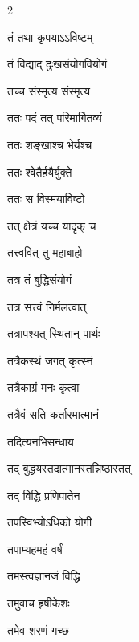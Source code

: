 \begin{multicols}{2}
\begin{indexlist}
\item तं तथा कृपयाऽऽविष्टम् \dotfill {}
\item तं विद्याद् दुःखसंयोगवियोगं \dotfill {}
\item तच्च संस्मृत्य संस्मृत्य \dotfill {}
\item ततः पदं तत् परिमार्गितव्यं \dotfill {}
\item ततः शङ्खाश्च भेर्यश्च \dotfill {}
\item ततः श्वेतैर्हयैर्युक्ते \dotfill {}
\item ततः स विस्मयाविष्टो \dotfill {}
\item तत् क्षेत्रं यच्च यादृक् च \dotfill {}
\item तत्त्ववित् तु महाबाहो \dotfill {}
\item तत्र तं बुद्धिसंयोगं \dotfill {}
\item तत्र सत्त्वं निर्मलत्वात् \dotfill {}
\item तत्रापश्यत् स्थितान् पार्थः \dotfill {}
\item तत्रैकस्थं जगत् कृत्स्नं \dotfill {}
\item तत्रैकाग्रं मनः कृत्वा \dotfill {}
\item तत्रैवं सति कर्तारमात्मानं \dotfill {}
\item तदित्यनभिसन्धाय \dotfill {}
\item तद् बुद्धयस्तदात्मानस्तन्निष्ठास्तत् \dotfill {}
\item तद् विद्धि प्रणिपातेन \dotfill {}
\item तपस्विभ्योऽधिको योगी \dotfill {}
\item तपाम्यहमहं वर्षं \dotfill {}
\item तमस्त्वज्ञानजं विद्धि \dotfill {}
\item तमुवाच हृषीकेशः \dotfill {}
\item तमेव शरणं गच्छ \dotfill {}

\end{indexlist}
\end{multicols}
